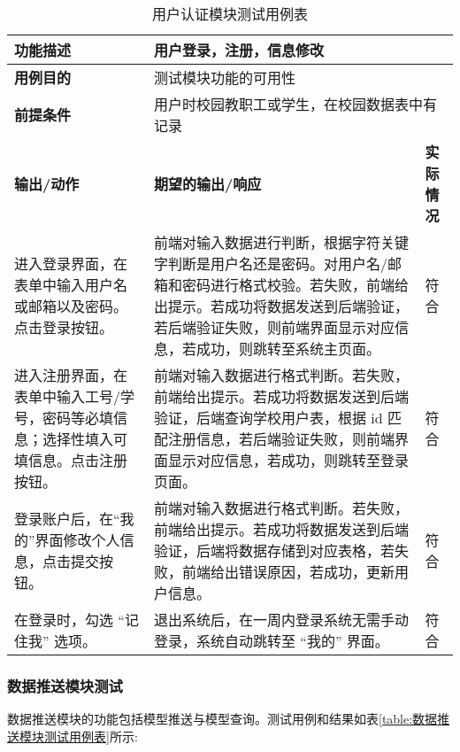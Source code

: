 \begin{table}[H]
  \centering
  \small
  \renewcommand\arraystretch{1.1}
  \caption{用户认证模块测试用例表}
  \label{table:用户认证模块测试用例表}
  \setlength{\tabcolsep}{4mm}
  \begin{tabular}{|p{4.5cm}|p{6.5cm}|p{1.5cm}|}
    \hline \textbf{功能描述} & \multicolumn{2}{l|}{用户登录，注册，信息修改} \\
    \hline \textbf{用例目的} & \multicolumn{2}{l|}{测试模块功能的可用性} \\
    \hline \textbf{前提条件} & \multicolumn{2}{l|}{用户时校园教职工或学生，在校园数据表中有记录} \\
    \hline \textbf{输出/动作} & \textbf{期望的输出/响应} & \textbf{实际情况} \\
    \hline 进入登录界面，在表单中输入用户名或邮箱以及密码。点击登录按钮。 & 前端对输入数据进行判断，根据字符关键字判断是用户名还是密码。对用户名/邮箱和密码进行格式校验。若失败，前端给出提示。若成功将数据发送到后端验证，若后端验证失败，则前端界面显示对应信息，若成功，则跳转至系统主页面。 & 符合  \\
    \hline 进入注册界面，在表单中输入工号/学号，密码等必填信息；选择性填入可填信息。点击注册按钮。 & 前端对输入数据进行格式判断。若失败，前端给出提示。若成功将数据发送到后端验证，后端查询学校用户表，根据 id 匹配注册信息，若后端验证失败，则前端界面显示对应信息，若成功，则跳转至登录页面。 & 符合  \\
    \hline 登录账户后，在``我的''界面修改个人信息，点击提交按钮。 & 前端对输入数据进行格式判断。若失败，前端给出提示。若成功将数据发送到后端验证，后端将数据存储到对应表格，若失败，前端给出错误原因，若成功，更新用户信息。 & 符合  \\
    \hline 在登录时，勾选 ``记住我'' 选项。 & 退出系统后，在一周内登录系统无需手动登录，系统自动跳转至 ``我的'' 界面。 & 符合  \\
    \hline
  \end{tabular}
\end{table}

\subsubsection{数据推送模块测试}

数据推送模块的功能包括模型推送与模型查询。测试用例和结果如表\ref{table:数据推送模块测试用例表}所示:

